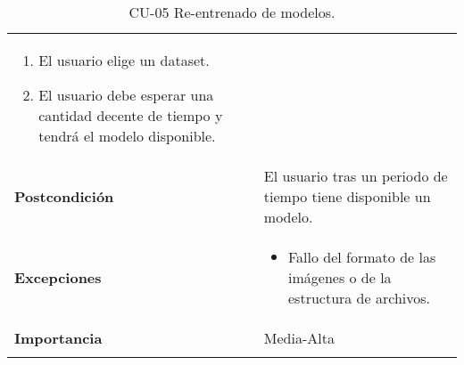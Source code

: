 \begin{longtable}[H]{@{}ll@{}}
\begin{minipage}[t]{0.68\columnwidth}
\begin{enumerate}
\def\labelenumi{\arabic{enumi}.}
\tightlist
\item
  El usuario elige un dataset.
\item
  El usuario debe esperar una cantidad decente de tiempo y tendrá el modelo disponible.
\end{enumerate}\strut
\end{minipage}\tabularnewline
\begin{minipage}[t]{0.26\columnwidth}\raggedright\strut
\textbf{Postcondición}\strut
\end{minipage} & \begin{minipage}[t]{0.68\columnwidth}\raggedright\strut%
El usuario tras un periodo de tiempo tiene disponible un modelo.\strut
\end{minipage}\tabularnewline
\begin{minipage}[t]{0.26\columnwidth}\raggedright\strut
\textbf{Excepciones}\strut
\end{minipage} & \begin{minipage}[t]{0.68\columnwidth}\raggedright\strut%
\begin{itemize}
\tightlist
\item
  Fallo del formato de las imágenes o de la estructura de archivos.
\end{itemize}\strut
\end{minipage}\tabularnewline
\begin{minipage}[t]{0.26\columnwidth}\raggedright\strut
\textbf{Importancia}\strut
\end{minipage} & \begin{minipage}[t]{0.68\columnwidth}\raggedright\strut%
Media-Alta\strut
\end{minipage}\tabularnewline
\bottomrule%
\caption{CU-05 Re-entrenado de modelos.}
\end{longtable}
